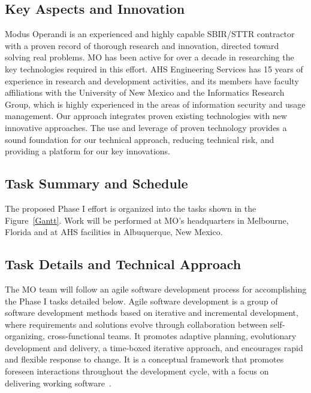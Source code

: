 \documentclass{sbir}
\begin{document}
\subsection{Key Aspects and Innovation}
Modus Operandi is an experienced and highly capable SBIR/STTR contractor with a proven record of thorough research and innovation, directed toward solving real problems. MO has been active for over a decade in researching the key technologies required in this effort. AHS Engineering Services has 15 years of experience in research and development activities, and its members have faculty affiliations with the University of New Mexico and the Informatics Research Group, which is highly experienced in the areas of information security and usage management. Our approach integrates proven existing technologies with new innovative approaches. The use and leverage of proven technology provides a sound foundation for our technical approach, reducing technical risk, and providing a platform for our key innovations.

\subsection{Task Summary and Schedule}
The proposed Phase I effort is organized into the tasks shown in the Figure~\ref{Gantt}. Work will be performed at MO's headquarters in Melbourne, Florida and at AHS facilities in Albuquerque, New Mexico.
\vspace{-0.1in}
\begin{center}
\end{center}

\subsection{Task Details and Technical Approach}
The MO team will follow an agile software development process for accomplishing the Phase I tasks detailed below. Agile software development is a group of software development methods based on iterative and incremental development, where requirements and solutions evolve through collaboration between self-organizing, cross-functional teams. It promotes adaptive planning, evolutionary development and delivery, a time-boxed iterative approach, and encourages rapid and flexible response to change. It is a conceptual framework that promotes foreseen interactions throughout the development cycle, with a focus on delivering working software~\cite{La:03}.
\end{document}

